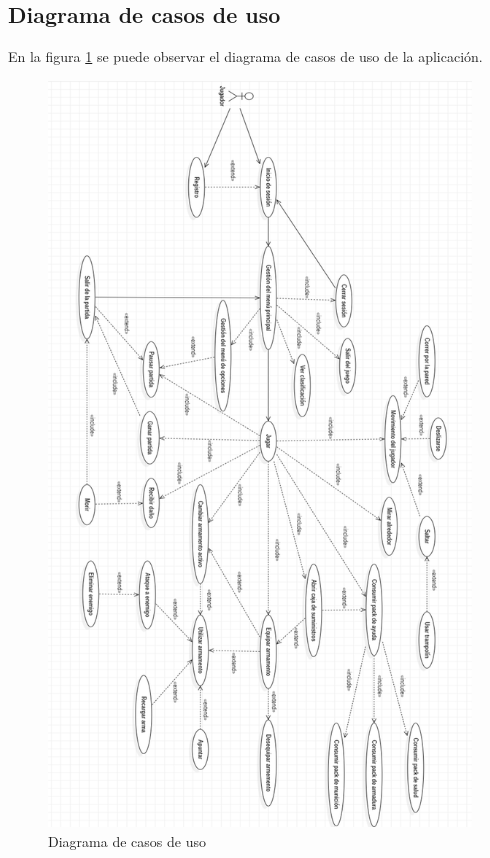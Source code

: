 \subsection{Diagrama de casos de uso}
En la figura \ref{fig:CasosdeUso} se puede observar el diagrama de casos de uso de la aplicación.
\begin{figure}[h]
	\centering
	\includegraphics[scale=0.4]{img/UseCaseDiagram.png}
	\caption{Diagrama de casos de uso}
	\label{fig:CasosdeUso}
    \end{figure}
    
